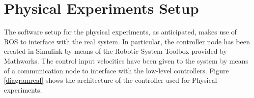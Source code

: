 \section{Physical Experiments Setup}
The software setup for the physical experiments, as anticipated, makes use of ROS to interface with the real system. In particular, the controller node has been created in Simulink by means of the Robotic System Toolbox provided by Mathworks. The control input velocities have been given to the system by means of a communication node to interface with the low-level controllers. Figure \ref{diagramreal} shows the architecture of the controller used for Physical experiments.



